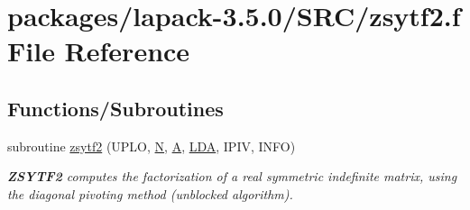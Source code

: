 \hypertarget{zsytf2_8f}{}\section{packages/lapack-\/3.5.0/\+S\+R\+C/zsytf2.f File Reference}
\label{zsytf2_8f}
\subsection*{Functions/\+Subroutines}
\begin{DoxyCompactItemize}
\item 
subroutine \hyperlink{group__complex16SYcomputational_ga08a69231abc76ecca401fad02c8e0821}{zsytf2} (U\+P\+L\+O, \hyperlink{polmisc_8c_a0240ac851181b84ac374872dc5434ee4}{N}, \hyperlink{classA}{A}, \hyperlink{example__user_8c_ae946da542ce0db94dced19b2ecefd1aa}{L\+D\+A}, I\+P\+I\+V, I\+N\+F\+O)
\begin{DoxyCompactList}\small\item\em {\bfseries Z\+S\+Y\+T\+F2} computes the factorization of a real symmetric indefinite matrix, using the diagonal pivoting method (unblocked algorithm). \end{DoxyCompactList}\end{DoxyCompactItemize}

